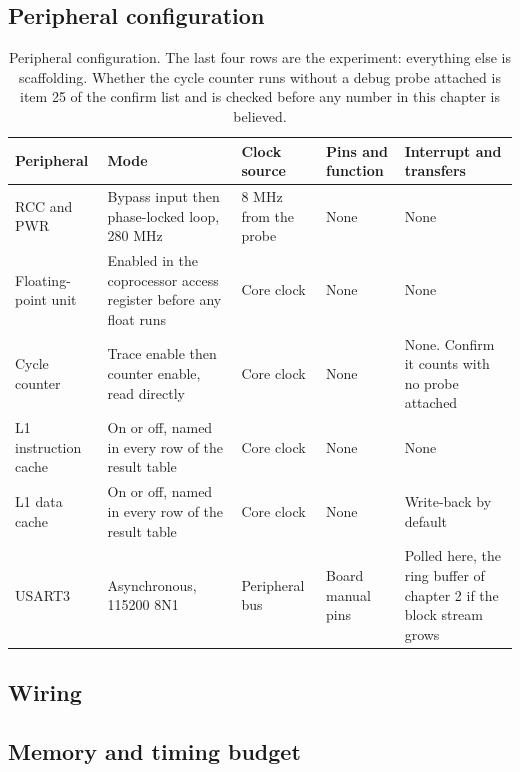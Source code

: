 \subsection*{Peripheral configuration}

\begin{table}[H]\centering\small
\begin{tabular}{p{22mm}p{26mm}p{24mm}p{30mm}p{30mm}}
\toprule
Peripheral & Mode & Clock source & Pins and function & Interrupt and transfers \\
\midrule
RCC and PWR & Bypass input then phase-locked loop, 280 MHz & 8 MHz from the probe & None & None \\
Floating-point unit & Enabled in the coprocessor access register before any float runs & Core clock & None & None \\
Cycle counter & Trace enable then counter enable, read directly & Core clock & None & None. Confirm it counts with no probe attached \\
L1 instruction cache & On or off, named in every row of the result table & Core clock & None & None \\
L1 data cache & On or off, named in every row of the result table & Core clock & None & Write-back by default \\
USART3 & Asynchronous, 115200 8N1 & Peripheral bus & Board manual pins & Polled here, the ring buffer of chapter 2 if the block stream grows \\
\bottomrule
\end{tabular}
\caption{Peripheral configuration. The last four rows are the experiment: everything else is scaffolding. Whether the cycle counter runs without a debug probe attached is item 25 of the confirm list and is checked before any number in this chapter is believed.}
\end{table}

\subsection*{Wiring}


\subsection*{Memory and timing budget}


